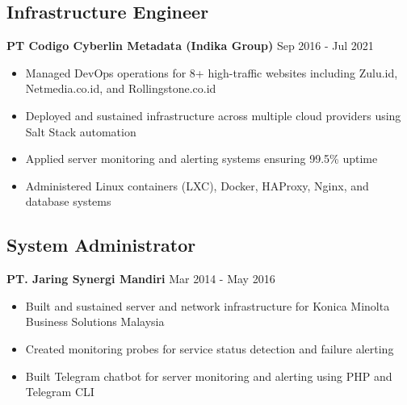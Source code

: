 \documentclass[11pt,a4paper]{article}
\newcommand{\company}[1]{\textbf{\color{primary}#1}}
\newcommand{\daterange}[1]{\color{secondary}#1}  %
\begin{document}
\subsection{Infrastructure Engineer}
\company{PT Codigo Cyberlin Metadata (Indika Group)} \hfill \daterange{Sep 2016 - Jul 2021}
\begin{itemize}[leftmargin=*, itemsep=2pt]
    \item Managed DevOps operations for 8+ high-traffic websites including Zulu.id, Netmedia.co.id, and Rollingstone.co.id
        \item Deployed and sustained infrastructure across multiple cloud providers using Salt Stack automation
        \item Applied server monitoring and alerting systems ensuring 99.5\% uptime
    \item Administered Linux containers (LXC), Docker, HAProxy, Nginx, and database systems
\end{itemize}

\subsection{System Administrator}
\company{PT. Jaring Synergi Mandiri} \hfill \daterange{Mar 2014 - May 2016}
\begin{itemize}[leftmargin=*, itemsep=2pt]
        \item Built and sustained server and network infrastructure for Konica Minolta Business Solutions Malaysia
        \item Created monitoring probes for service status detection and failure alerting
        \item Built Telegram chatbot for server monitoring and alerting using PHP and Telegram CLI
\end{itemize}

\end{document}
